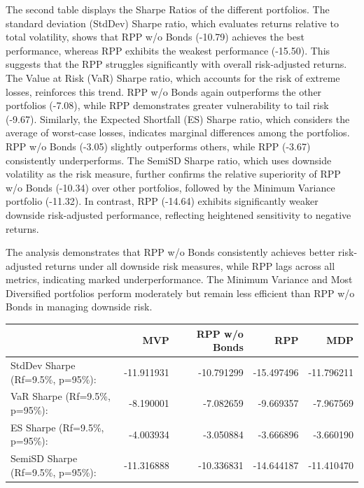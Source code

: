 \documentclass[11pt,preprint]{elsarticle}
\let\origtable\table
\let\endorigtable\endtable
\renewenvironment{table}[1][2] {
    \expandafter\origtable\expandafter[H]
} {
    \endorigtable
}
\numberwithin{equation}{section}
\numberwithin{figure}{section}
\numberwithin{table}{section}
\begin{document}
The second table displays the Sharpe Ratios of the different portfolios.
The standard deviation (StdDev) Sharpe ratio, which evaluates returns
relative to total volatility, shows that RPP w/o Bonds (-10.79) achieves
the best performance, whereas RPP exhibits the weakest performance
(-15.50). This suggests that the RPP struggles significantly with
overall risk-adjusted returns. The Value at Risk (VaR) Sharpe ratio,
which accounts for the risk of extreme losses, reinforces this trend.
RPP w/o Bonds again outperforms the other portfolios (-7.08), while RPP
demonstrates greater vulnerability to tail risk (-9.67). Similarly, the
Expected Shortfall (ES) Sharpe ratio, which considers the average of
worst-case losses, indicates marginal differences among the portfolios.
RPP w/o Bonds (-3.05) slightly outperforms others, while RPP (-3.67)
consistently underperforms. The SemiSD Sharpe ratio, which uses downside
volatility as the risk measure, further confirms the relative
superiority of RPP w/o Bonds (-10.34) over other portfolios, followed by
the Minimum Variance portfolio (-11.32). In contrast, RPP (-14.64)
exhibits significantly weaker downside risk-adjusted performance,
reflecting heightened sensitivity to negative returns.

The analysis demonstrates that RPP w/o Bonds consistently achieves
better risk-adjusted returns under all downside risk measures, while RPP
lags across all metrics, indicating marked underperformance. The Minimum
Variance and Most Diversified portfolios perform moderately but remain
less efficient than RPP w/o Bonds in managing downside risk.

\begin{table}
\centering
\caption{\label{tab:sharpe-ratios}Sharpe Ratios}
\centering
\begin{tabular}[t]{l|r|r|r|r}
\hline
  & MVP & RPP w/o Bonds & RPP & MDP\\
\hline
StdDev Sharpe (Rf=9.5\%, p=95\%): & -11.911931 & -10.791299 & -15.497496 & -11.796211\\
\hline
VaR Sharpe (Rf=9.5\%, p=95\%): & -8.190001 & -7.082659 & -9.669357 & -7.967569\\
\hline
ES Sharpe (Rf=9.5\%, p=95\%): & -4.003934 & -3.050884 & -3.666896 & -3.660190\\
\hline
SemiSD Sharpe (Rf=9.5\%, p=95\%): & -11.316888 & -10.336831 & -14.644187 & -11.410470\\
\hline
\end{tabular}
\end{table}
\end{document}
